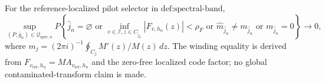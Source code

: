 For the reference-localized pilot selector in \(\text{def:spectral-band}\),
\[
 \sup_{(P,\bar g_n)\in\mathcal Q_{\mathrm{spec},n}}
 P\left\{\widehat j_n=\varnothing\text{ or }
 \inf_{v\in\mathcal I,z\in C_{\widehat j_n}}|F_{v,h_n}(z)|<\rho_F
 \text{ or }\widehat m_{\widehat j_n}\ne m_{\widehat j_n}
 \text{ or }m_{\widehat j_n}=0\right\}\longrightarrow0,
\]
where \(m_j=(2\pi i)^{-1}\oint_{C_j}M'(z)/M(z)\,dz\).  The winding equality is derived from \(F_{v_{\mathrm{ref}},h_n}=MA_{v_{\mathrm{ref}},h_n}\) and the zero-free localized code factor; no global contaminated-transform claim is made.